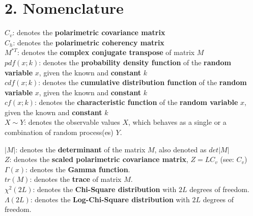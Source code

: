 \documentclass[a4paper, oneside, 11pt]{Latex/Classes/PhDthesisPSnPDF}
\begin{document}
\newpage

\section*{2. Nomenclature}

\begin{multicols}{2} %

$C_v$: denotes the {\bf polarimetric covariance matrix}\\

$C_h$: denotes the {\bf polarimetric coherency matrix}\\

$M^{*T}$: denotes the {\bf complex conjugate transpose} of matrix $M$ \\

$pdf(x;k)$: denotes the {\bf probability density function} of the {\bf random variable} $x$,
  given the known and {\bf constant} $k$\\

$cdf(x;k)$: denotes the {\bf cumulative distribution function} of the {\bf random variable} $x$,
  given the known and {\bf constant} $k$\\  

$cf(x;k)$: denotes the {\bf characteristic function} of the {\bf random variable} $x$,
  given the known and {\bf constant} $k$\\  

$X \sim Y$: denotes the observable values $X$,
  which behaves as a single or a combination of random process(es) $Y$. 
  
$|M|$: denotes the {\bf determinant} of the matrix $M$, also denoted as $det|M|$\\

$Z$: denotes the {\bf scaled polarimetric covariance matrix}, $Z=LC_v$ (see: $C_v$)\\

$\Gamma(x)$: denotes the {\bf Gamma function}.\\

$tr(M)$: denotes the {\bf trace} of matrix $M$.\\

$\chi^2(2L)$: denotes the {\bf Chi-Square distribution} with $2L$ degrees of freedom.\\

$\Lambda(2L)$: denotes the {\bf Log-Chi-Square distribution} with $2L$ degrees of freedom.\\
  
  
\end{multicols}
\end{document}

